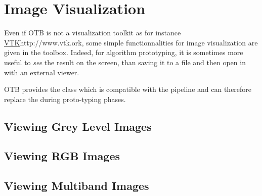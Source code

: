 \chapter{Image Visualization}
\label{chap:ImageVisualization}
Even if OTB is not a visualization toolkit as for instance
\url{VTK}{http://www.vtk.ork}, some simple functionnalities for image
visualization are given in the toolbox. Indeed, for algorithm
prototyping, it is sometimes more useful to \emph{see} the result on
the screen, than saving it to a file and then open in with an external
viewer.

OTB provides the  class which is compatible
with the pipeline and can therefore replace the
 during proto-typing phases.

\section{Viewing Grey Level Images}
\label{sec:ViewingGreyLevelImages}

\section{Viewing RGB Images}
\label{sec:ViewingRGBImages}
\section{Viewing Multiband Images}
\label{sec:ViewingMultibandImages}
